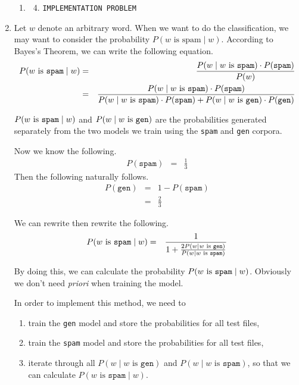 \documentclass[11pt]{article}
\begin{document}
\begin{enumerate}
\begin{enumerate}[label=(\alph*)]
	\item %
		\begin{enumerate}[label=\roman*.]
		\setcounter{enumiii}{3}
		\item %
			\texttt{IMPLEMENTATION PROBLEM}
		\end{enumerate}
	\end{enumerate}
\item %
	Let $w$ denote an arbitrary word. When we want to do the classification, we may want to consider the probability $P(w \text{ is spam} \mid w)$. According to Bayes's Theorem, we can write the following equation.
	\begin{eqnarray*}
		P(w \text{ is \texttt{spam}} \mid w) &=& \frac{P(w \mid w \text{ is \texttt{spam}}) \cdot P(\texttt{spam})}{P(w)} \\
	               &=& \frac{P(w \mid w \text{ is \texttt{spam}}) \cdot P(\texttt{spam})}{P(w \mid w \text{ is \texttt{spam}}) \cdot P(\texttt{spam}) + P(w \mid w \text{ is \texttt{gen}}) \cdot P(\texttt{gen})}
	\end{eqnarray*}

	$P(w \text{ is \texttt{spam}} \mid w)$ and $P(w \mid w \text{ is \texttt{gen}})$ are the probabilities generated separately from the two models we train using the \texttt{spam} and \texttt{gen} corpora.

	Now we know the following.
	\begin{eqnarray*}
		P(\texttt{spam}) &=& \frac{1}{3}
	\end{eqnarray*}
	Then the following naturally follows. 
	\begin{eqnarray*}
		P(\texttt{gen}) &=& 1 - P(\texttt{spam}) \\
			&=& \frac{2}{3}
	\end{eqnarray*}

	We can rewrite then rewrite the following.
	\begin{eqnarray*}
		P(w \text{ is \texttt{spam}} \mid w) &=& \frac{1}{1 + \frac{2P(w \mid w \text{ is \texttt{gen}})}{P(w \mid w \text{ is \texttt{spam}})}}
	\end{eqnarray*}

	By doing this, we can calculate the probability $P(w \text{ is \texttt{spam}} \mid w)$. Obviously we don't need \textit{priori} when training the model.

	In order to implement this method, we need to
	\begin{enumerate}[label=\roman*.]
		\item
			train the \texttt{gen} model and store the probabilities for all test files,
		\item
			train the \texttt{spam} model and store the probabilities for all test files,
		\item
			iterate through all $P(w \mid w \text{ is } \texttt{gen})$ and $P(w \mid w \text{ is } \texttt{spam})$, so that we can calculate $P(w \text{ is } \texttt{spam} \mid w)$.


\end{enumerate}
\end{enumerate}
\end{document}
